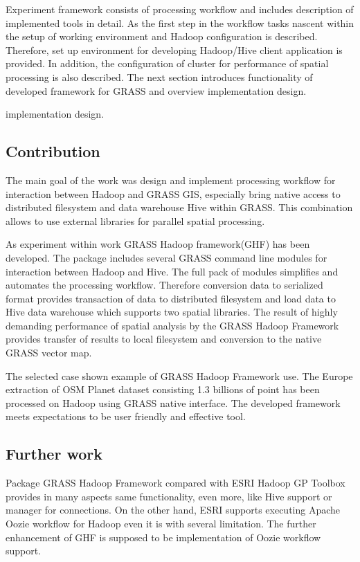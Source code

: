 \documentclass[a4paper,12pt,oneside]{report}
\begin{document}
   
   Experiment framework consists of processing workflow and includes description of
   implemented tools in detail. As the first step in the workflow tasks nascent
   within the setup of working environment and Hadoop configuration is described. Therefore,
   set up environment for developing Hadoop/Hive client application is provided. In addition,
   the configuration of  cluster for performance of spatial processing is also described.
   The next section introduces functionality of developed framework for GRASS and overview
   implementation design. 
   

	implementation design.  
	
	\subsection*{Contribution}
 The main goal of the work was design and implement processing workflow for
 interaction  between  Hadoop and GRASS GIS, especially bring native access to
 distributed filesystem and data warehouse Hive within GRASS. This combination
 allows to use external libraries for parallel spatial processing.
 
 As experiment within work GRASS Hadoop framework(GHF) has been developed.
 The package includes several GRASS command line modules for interaction between
 Hadoop and Hive. The full pack of modules simplifies and automates the
 processing workflow. Therefore conversion data to serialized format provides
 transaction of data to distributed filesystem and load data to Hive data
 warehouse which supports two spatial libraries. The result of highly demanding
 performance of spatial analysis by the GRASS Hadoop Framework provides transfer of
 results to local filesystem and conversion to the native GRASS vector map.
 
 The selected case shown example of GRASS Hadoop Framework use. The Europe extraction of OSM Planet dataset consisting 1.3 billions of point
 has been processed on Hadoop using GRASS native interface. The developed framework
 meets expectations to be user friendly and effective tool.
	
	\subsection*{Further work}
Package GRASS Hadoop Framework compared with ESRI Hadoop GP Toolbox
provides in many aspects same functionality, even more, like Hive support or manager for connections. On the other hand, ESRI supports executing Apache Oozie workflow for Hadoop even it is with several limitation. The further enhancement of GHF is supposed to be implementation of Oozie workflow support.
\end{document}
